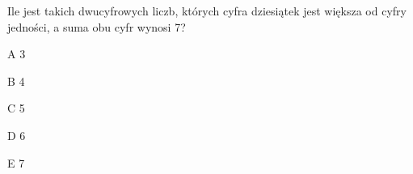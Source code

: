 \begin{tresc}
Ile jest takich dwucyfrowych liczb, których cyfra dziesiątek jest większa od cyfry jedności, a suma obu cyfr wynosi 7?
\end{tresc}
\begin{wariant}{A} 3 \end{wariant}
\begin{wariant}{B} 4 \end{wariant}
\begin{wariant}{C} 5 \end{wariant}
\begin{wariant}{D} 6 \end{wariant}
\begin{wariant}{E} 7 \end{wariant}
